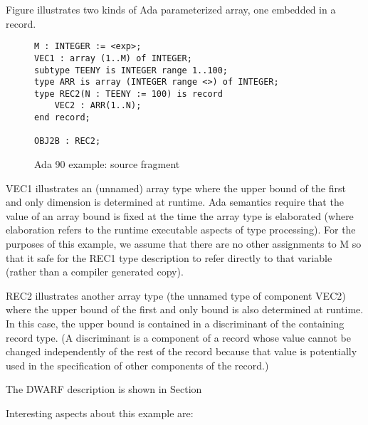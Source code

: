 Figure 
illustrates two kinds of Ada parameterized array, one embedded in a record.


\begin{figure}[here]
\begin{lstlisting}
M : INTEGER := <exp>;
VEC1 : array (1..M) of INTEGER;
subtype TEENY is INTEGER range 1..100;
type ARR is array (INTEGER range <>) of INTEGER;
type REC2(N : TEENY := 100) is record
    VEC2 : ARR(1..N);
end record;

OBJ2B : REC2;
\end{lstlisting}
\caption{Ada 90 example: source fragment} \label{fig:adaexamplesourcefragment}
\end{figure}

VEC1 illustrates an (unnamed) array type where the upper bound
of the first and only dimension is determined at runtime. Ada
semantics require that the value of an array bound is fixed at
the time the array type is elaborated (where elaboration refers
to the runtime executable aspects of type processing). For
the purposes of this example, we assume that there are no
other assignments to M so that it safe for the REC1 type
description to refer directly to that variable (rather than
a compiler generated copy).

REC2 illustrates another array type (the unnamed type of
component VEC2) where the upper bound of the first and only
bound is also determined at runtime. In this case, the upper
bound is contained in a discriminant of the containing record
type. (A discriminant is a component of a record whose value
cannot be changed independently of the rest of the record
because that value is potentially used in the specification
of other components of the record.)

The DWARF description is shown in 
Section 


Interesting aspects about this example are:

